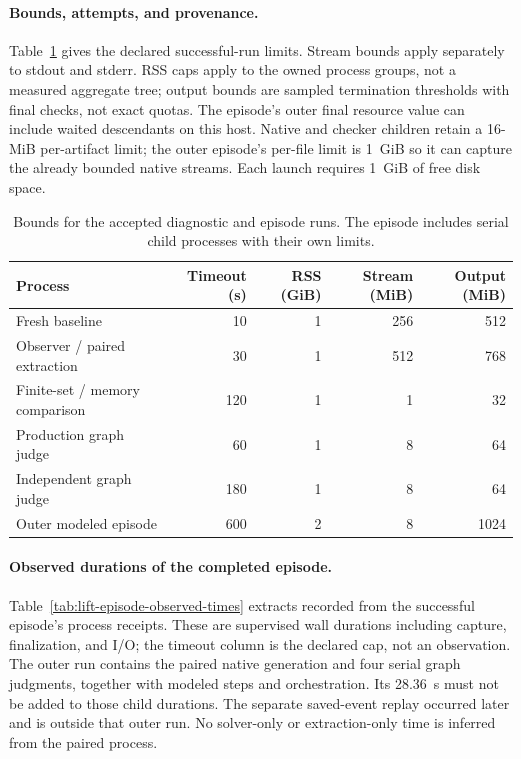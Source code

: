 \paragraph{Bounds, attempts, and provenance.}
Table~\ref{tab:lift-followup-bounds} gives the declared successful-run
limits. Stream bounds apply separately to stdout and stderr.
RSS caps apply to the owned process groups, not a measured aggregate
tree; output bounds are sampled termination thresholds with final
checks, not exact quotas. The episode's outer final 
resource value can include waited descendants on this host.
Native and checker children retain a 16-MiB per-artifact limit; the
outer episode's per-file limit is 1~GiB so it can capture the already
bounded native streams. Each launch requires 1~GiB of free disk space.

\begin{table}[htbp]
\centering\small
\caption{Bounds for the accepted diagnostic and episode runs.
The episode includes serial child processes with their own limits.}
\label{tab:lift-followup-bounds}
\begin{tabular}{@{}lrrrr@{}}
\toprule
Process & Timeout (s) & RSS (GiB) & Stream (MiB) & Output (MiB)\\
\midrule
Fresh baseline & 10 & 1 & 256 & 512\\
Observer / paired extraction & 30 & 1 & 512 & 768\\
Finite-set / memory comparison & 120 & 1 & 1 & 32\\
Production graph judge & 60 & 1 & 8 & 64\\
Independent graph judge & 180 & 1 & 8 & 64\\
Outer modeled episode & 600 & 2 & 8 & 1024\\
\bottomrule
\end{tabular}
\end{table}

\paragraph{Observed durations of the completed episode.}
Table~\ref{tab:lift-episode-observed-times} extracts recorded
 from the successful episode's process receipts.
These are supervised wall durations including capture, finalization,
and I/O; the timeout column is the declared cap, not an observation.
The outer run contains the paired native generation and four serial
graph judgments, together with modeled steps and orchestration. Its
28.36~s must not be added to those child durations. The separate saved-event
replay occurred later and is outside that outer run. No solver-only or
extraction-only time is inferred from the paired process.

